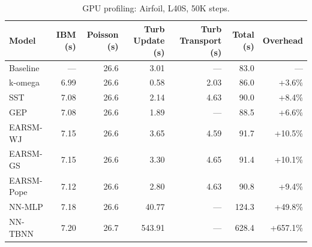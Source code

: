 \begin{table}[htbp]
\centering
\caption{GPU profiling: Airfoil, L40S, 50K steps.}
\label{tab:gpu_profiling_airfoil}
\begin{tabular}{lrrrrrr}
\toprule
\textbf{Model} & \textbf{IBM (s)} & \textbf{Poisson (s)} & \textbf{Turb Update (s)} & \textbf{Turb Transport (s)} & \textbf{Total (s)} & \textbf{Overhead} \\
\midrule
Baseline & --- & 26.6 & 3.01 & --- & 83.0 & --- \\
k-omega & 6.99 & 26.6 & 0.58 & 2.03 & 86.0 & +3.6\% \\
SST & 7.08 & 26.6 & 2.14 & 4.63 & 90.0 & +8.4\% \\
GEP & 7.08 & 26.6 & 1.89 & --- & 88.5 & +6.6\% \\
EARSM-WJ & 7.15 & 26.6 & 3.65 & 4.59 & 91.7 & +10.5\% \\
EARSM-GS & 7.15 & 26.6 & 3.30 & 4.65 & 91.4 & +10.1\% \\
EARSM-Pope & 7.12 & 26.6 & 2.80 & 4.63 & 90.8 & +9.4\% \\
NN-MLP & 7.18 & 26.6 & 40.77 & --- & 124.3 & +49.8\% \\
NN-TBNN & 7.20 & 26.7 & 543.91 & --- & 628.4 & +657.1\% \\
\bottomrule
\end{tabular}
\end{table}
